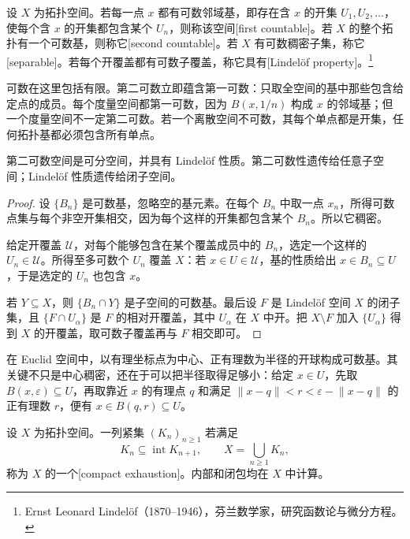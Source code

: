 \begin{definition}\label{g1:def:countability}
	设 \(X\) 为拓扑空间。若每一点 \(x\) 都有可数邻域基，即存在含 \(x\) 的开集 \(U_1,U_2,\ldots\)，使每个含 \(x\) 的开集都包含某个 \(U_n\)，则称该空间[first countable]。若 \(X\) 的整个拓扑有一个可数基，则称它[second countable]。若 \(X\) 有可数稠密子集，称它[separable]。若每个开覆盖都有可数子覆盖，称它具有[Lindelöf property]。\footnote{Ernst Leonard Lindelöf（1870--1946），芬兰数学家，研究函数论与微分方程。}
\end{definition}

可数在这里包括有限。第二可数立即蕴含第一可数：只取全空间的基中那些包含给定点的成员。每个度量空间都第一可数，因为 \(B(x,1/n)\) 构成 \(x\) 的邻域基；但一个度量空间不一定第二可数。若一个离散空间不可数，其每个单点都是开集，任何拓扑基都必须包含所有单点。

\begin{proposition}\label{g1:prop:second-countable-lindelof}
	第二可数空间是可分空间，并具有 Lindelöf 性质。第二可数性遗传给任意子空间；Lindelöf 性质遗传给闭子空间。
\end{proposition}
\begin{proof}
	设 \(\{B_n\}\) 是可数基，忽略空的基元素。在每个 \(B_n\) 中取一点 \(x_n\)，所得可数点集与每个非空开集相交，因为每个这样的开集都包含某个 \(B_n\)。所以它稠密。

	给定开覆盖 \(\mathcal U\)，对每个能够包含在某个覆盖成员中的 \(B_n\)，选定一个这样的 \(U_n\in\mathcal U\)。所得至多可数个 \(U_n\) 覆盖 \(X\)：若 \(x\in U\in\mathcal U\)，基的性质给出 \(x\in B_n\subseteq U\)，于是选定的 \(U_n\) 也包含 \(x\)。

	若 \(Y\subseteq X\)，则 \(\{B_n\cap Y\}\) 是子空间的可数基。最后设 \(F\) 是 Lindelöf 空间 \(X\) 的闭子集，且 \(\{F\cap U_\alpha\}\) 是 \(F\) 的相对开覆盖，其中 \(U_\alpha\) 在 \(X\) 中开。把 \(X\setminus F\) 加入 \(\{U_\alpha\}\) 得到 \(X\) 的开覆盖，取可数子覆盖再与 \(F\) 相交即可。
\end{proof}

在 Euclid 空间中，以有理坐标点为中心、正有理数为半径的开球构成可数基。其关键不只是中心稠密，还在于可以把半径取得足够小：给定 \(x\in U\)，先取 \(B(x,\varepsilon)\subseteq U\)，再取靠近 \(x\) 的有理点 \(q\) 和满足 \(\lVert x-q\rVert<r<\varepsilon-\lVert x-q\rVert\) 的正有理数 \(r\)，便有 \(x\in B(q,r)\subseteq U\)。

\begin{definition}\label{g1:def:compact-exhaustion}
	设 \(X\) 为拓扑空间。一列紧集 \((K_n)_{n\ge1}\) 若满足
	\[
		K_n\subseteq\operatorname{int}K_{n+1},\qquad
		X=\bigcup_{n\ge1}K_n,
	\]
	称为 \(X\) 的一个[compact exhaustion]。内部和闭包均在 \(X\) 中计算。
\end{definition}

